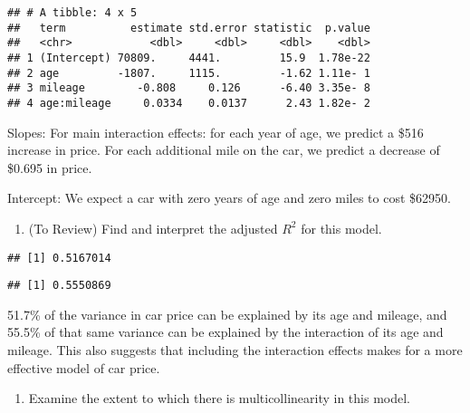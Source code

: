 \documentclass[
]{article}
\newenvironment{Shaded}{\begin{snugshade}}{\end{snugshade}}
\newcommand{\FunctionTok}[1]{\textcolor[rgb]{0.00,0.00,0.00}{#1}}
\newcommand{\NormalTok}[1]{#1}
\newcommand{\SpecialCharTok}[1]{\textcolor[rgb]{0.00,0.00,0.00}{#1}}
\providecommand{\tightlist}{%
  \setlength{\itemsep}{0pt}\setlength{\parskip}{0pt}}
\begin{document}
\begin{verbatim}
## # A tibble: 4 x 5
##   term          estimate std.error statistic  p.value
##   <chr>            <dbl>     <dbl>     <dbl>    <dbl>
## 1 (Intercept) 70809.     4441.         15.9  1.78e-22
## 2 age         -1807.     1115.         -1.62 1.11e- 1
## 3 mileage        -0.808     0.126      -6.40 3.35e- 8
## 4 age:mileage     0.0334    0.0137      2.43 1.82e- 2
\end{verbatim}

Slopes: For main interaction effects: for each year of age, we predict a
\$516 increase in price. For each additional mile on the car, we predict
a decrease of \$0.695 in price.

Intercept: We expect a car with zero years of age and zero miles to cost
\$62950.

\begin{enumerate}
\def\labelenumi{\arabic{enumi}.}
\setcounter{enumi}{1}
\tightlist
\item
  (To Review) Find and interpret the adjusted \(R^2\) for this model.
\end{enumerate}

\begin{Shaded}
\end{Shaded}

\begin{verbatim}
## [1] 0.5167014
\end{verbatim}

\begin{Shaded}
\end{Shaded}

\begin{verbatim}
## [1] 0.5550869
\end{verbatim}

51.7\% of the variance in car price can be explained by its age and
mileage, and 55.5\% of that same variance can be explained by the
interaction of its age and mileage. This also suggests that including
the interaction effects makes for a more effective model of car price.

\begin{enumerate}
\def\labelenumi{\arabic{enumi}.}
\setcounter{enumi}{2}
\tightlist
\item
  Examine the extent to which there is multicollinearity in this model.
\end{enumerate}
\end{document}
